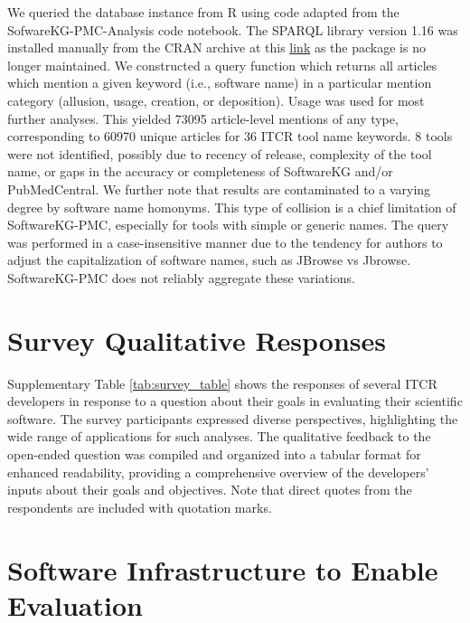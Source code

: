 \documentclass{article}
\begin{document}
We queried the database instance from R using code adapted from the SofwareKG-PMC-Analysis code notebook. The SPARQL library version 1.16 was installed manually from the CRAN archive at this \href{https://urldefense.com/v3/__https://cran.r-project.org/src/contrib/Archive/SPARQL/__;!!GuAItXPztq0!hBzPcpXZ3SCNtkVgVI9KgwxhTOgm6JY1gKzCzCFfer1uhtTUx-sWnQyzKdfDCT0yogPVN8-gs4KZy97R-JH4PN6VyojsQgQ$}{link} as the package is no longer maintained. We constructed a query function which returns all articles which mention a given keyword (i.e., software name) in a particular mention category (allusion, usage, creation, or deposition). Usage was used for most further analyses. This yielded 73095 article-level mentions of any type, corresponding to 60970 unique articles for 36 ITCR tool name keywords. 8 tools were not identified, possibly due to recency of release, complexity of the tool name, or gaps in the accuracy or completeness of SoftwareKG and/or PubMedCentral. We further note that results are contaminated to a varying degree by software name homonyms. This type of collision is a chief limitation of SoftwareKG-PMC, especially for tools with simple or generic names. The query was performed in a case-insensitive manner due to the tendency for authors to adjust the capitalization of software names, such as JBrowse vs Jbrowse. SoftwareKG-PMC does not reliably aggregate these variations.

\section{Survey Qualitative Responses}
\label{sec-supp-survey}

Supplementary Table \ref{tab:survey_table} shows the responses of several ITCR developers in response to a question about their goals in evaluating their scientific software. The survey participants expressed diverse perspectives, highlighting the wide range of applications for such analyses. The qualitative feedback to the open-ended question was compiled and organized into a tabular format for enhanced readability, providing a comprehensive overview of the developers' inputs about their goals and objectives. Note that direct quotes from the respondents are included with quotation marks.





\section{Software Infrastructure to Enable Evaluation}
\label{sec-supp-note-inf}
\end{document}

